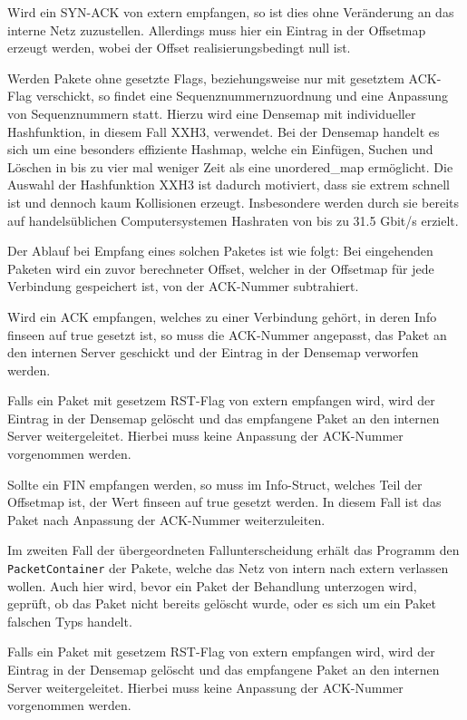 \documentclass[../review_2.tex]{subfiles}
\begin{document}
Wird ein SYN-ACK von extern empfangen, so ist dies ohne Veränderung an das interne Netz zuzustellen. Allerdings muss hier ein Eintrag in der Offsetmap erzeugt werden, wobei der Offset realisierungsbedingt null ist. 

Werden Pakete ohne gesetzte Flags, beziehungsweise nur mit gesetztem ACK-Flag verschickt, so findet eine Sequenznummernzuordnung und eine Anpassung von Sequenznummern statt. Hierzu wird eine Densemap mit individueller Hashfunktion, in diesem Fall XXH3, verwendet. Bei der Densemap handelt es sich um eine besonders effiziente Hashmap, welche ein Einfügen, Suchen und Löschen in bis zu vier mal weniger Zeit als eine unordered\_map ermöglicht. Die Auswahl der Hashfunktion XXH3 ist  dadurch motiviert, dass sie extrem schnell ist und dennoch kaum Kollisionen erzeugt. Insbesondere werden durch sie bereits auf handelsüblichen Computersystemen Hashraten von bis zu 31.5 Gbit/s erzielt.
 
Der Ablauf bei Empfang eines solchen Paketes ist wie folgt: Bei eingehenden Paketen wird ein zuvor berechneter Offset, welcher in der Offsetmap für jede Verbindung gespeichert ist, von der ACK-Nummer subtrahiert.

Wird ein ACK empfangen, welches zu einer Verbindung gehört, in deren Info finseen auf true gesetzt ist, so muss die ACK-Nummer angepasst, das Paket an den internen Server geschickt und der Eintrag in der Densemap verworfen werden.  
  
Falls ein Paket mit gesetzem RST-Flag von extern empfangen wird, wird der Eintrag in der Densemap gelöscht und das empfangene Paket an den internen Server weitergeleitet. Hierbei muss keine Anpassung der ACK-Nummer vorgenommen werden.
 
Sollte ein FIN empfangen werden, so muss im Info-Struct, welches Teil der Offsetmap ist, der Wert finseen auf true gesetzt werden. In diesem Fall ist das Paket nach Anpassung der ACK-Nummer weiterzuleiten.



Im zweiten Fall der übergeordneten Fallunterscheidung erhält das Programm den \texttt{PacketContainer} der Pakete, welche das Netz von intern nach extern verlassen wollen. Auch hier wird, bevor ein Paket der Behandlung unterzogen wird, geprüft, ob das Paket nicht bereits gelöscht wurde, oder es sich um ein Paket falschen Typs handelt. 

Falls ein Paket mit gesetzem RST-Flag von extern empfangen wird, wird der Eintrag in der Densemap gelöscht und das empfangene Paket an den internen Server weitergeleitet. Hierbei muss keine Anpassung der ACK-Nummer vorgenommen werden.
\end{document}
